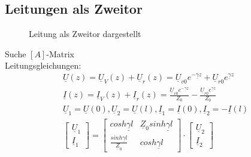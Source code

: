 \subsection{Leitungen als Zweitor}
\begin{figure}[!h]
	\centering
	
	\caption{Leitung als Zweitor dargestellt}
	\label{fig:leitungstheorie:zweitor}
\end{figure}
Suche $[A]$-Matrix\\
Leitungsgleichungen:\\
\begin{align}
	\underline{U}(z)=\underline{U}_V(z)+\underline{U}_r(z)=\underline{U}_{v0}e^{-\underline{\gamma}z}+\underline{U}_{r0}e^{\underline{\gamma}z}\nonumber\\
	\underline{I}(z)=\underline{I}_V(z)+\underline{I}_r(z)=\frac{\underline{U}_{v0}e^{-\underline{\gamma}z}}{Z_0}-\frac{\underline{U}_{r0}e^{\underline{\gamma}z}}{Z_0}\nonumber\\
	\underline{U}_1=\underline{U}(0), \underline{U}_2=\underline{U}(l),
	\underline{I}_1=\underline{I}(0), \underline{I}_2=-\underline{I}(l)\nonumber\\
	\begin{bmatrix}
 		\underline{U}_1\\
 		\underline{I}_1
	\end{bmatrix}=
	\begin{bmatrix}
 		cosh\underline{\gamma}l & \underline{Z}_0sinh\underline{\gamma}l\\
 		\frac{sinh\underline{\gamma}l}{\underline{Z}_0} & cosh\underline{\gamma}l
	\end{bmatrix}\cdot
	\begin{bmatrix}
		\underline{U}_2\\
		\underline{I}_2
	\end{bmatrix}\nonumber
\end{align}

